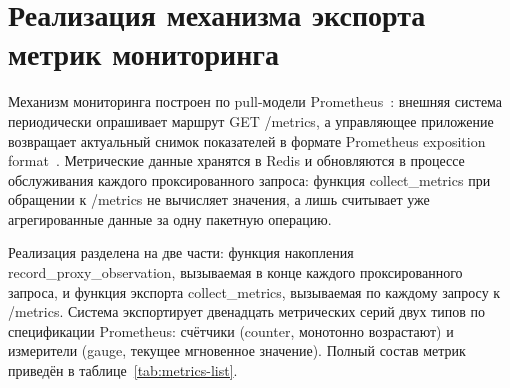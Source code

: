 \section{Реализация механизма экспорта метрик мониторинга}


Механизм мониторинга построен по pull-модели Prometheus~\cite{prometheus-docs}: внешняя система периодически опрашивает маршрут GET /metrics, а управляющее приложение возвращает актуальный снимок показателей в формате Prometheus exposition format~\cite{prometheus-exposition}. Метрические данные хранятся в Redis и обновляются в процессе обслуживания каждого проксированного запроса: функция collect\_metrics при обращении к /metrics не вычисляет значения, а лишь считывает уже агрегированные данные за одну пакетную операцию.

Реализация разделена на две части: функция накопления record\_proxy\_observation, вызываемая в конце каждого проксированного запроса, и функция экспорта collect\_metrics, вызываемая по каждому запросу к /metrics. Система экспортирует двенадцать метрических серий двух типов по спецификации Prometheus: счётчики (counter, монотонно возрастают) и измерители (gauge, текущее мгновенное значение). Полный состав метрик приведён в таблице~\ref{tab:metrics-list}.

